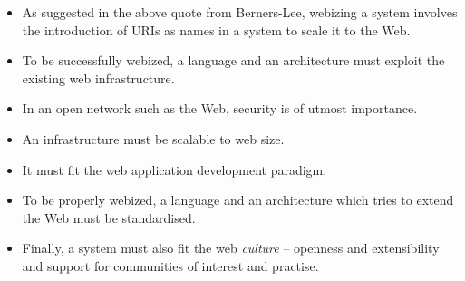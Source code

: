 \documentclass{tlp}
\begin{document}
\begin{itemize}

\item As suggested in the above quote from Berners-Lee, webizing a system involves the introduction of URIs as names in a system to scale it to the Web. %

\item To be successfully webized, a language and an architecture must exploit the existing web infrastructure. %

\item In an open network such as the Web, security is of utmost importance.

\item An infrastructure must be scalable to web size.

\item It must fit the web application development paradigm.

\item To be properly webized, a language and an architecture which tries to extend the Web must be standardised. %

\item Finally, a system must also fit the web \textit{culture} -- openness and
extensibility and support for communities of interest and practise. %

\end{itemize}
\end{document}
